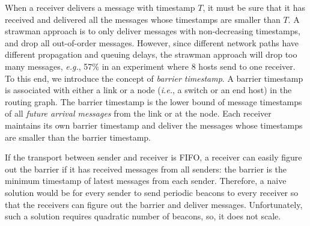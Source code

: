 When a receiver delivers a message with timestamp $T$, it must be sure that it has received and delivered all the messages whose timestamps are smaller than $T$.
A strawman approach is to only deliver messages with non-decreasing timestamps, and drop all out-of-order messages.
However, since different network paths have different propagation and queuing delays, the strawman approach will drop too many messages, \textit{e.g.}, 57\% in an experiment where 8 hosts send to one receiver.
To this end, we introduce the concept of \emph{barrier timestamp}.
A barrier timestamp is associated with either a link or a node (\textit{i.e.}, a switch or an end host) in the routing graph.
The barrier timestamp is the lower bound of message timestamps of all \emph{future arrival messages} from the link or at the node.
Each receiver maintains its own barrier timestamp and deliver the messages whose timestamps are smaller than the barrier timestamp.

If the transport between sender and receiver is FIFO, a receiver can easily figure out the barrier if it has received messages from all senders: the barrier is the minimum timestamp of latest messages from each sender. Therefore, a naive solution would be for every sender to send periodic beacons to every receiver so that the receivers can figure out the barrier and deliver messages. Unfortunately, such a solution requires quadratic number of beacons, so, it does not scale.






